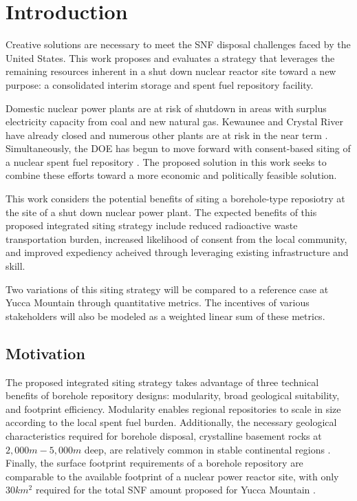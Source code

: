 
\section{Introduction}
Creative solutions are necessary to meet the \gls{SNF} disposal challenges 
faced by the United States.
This work proposes and evaluates a strategy that leverages the 
remaining resources inherent in a shut down nuclear reactor site toward a new 
purpose: a consolidated interim storage and spent fuel repository facility.

Domestic nuclear power plants are at risk of shutdown in areas with surplus 
electricity capacity from coal and new natural gas. Kewaunee and Crystal River 
have already closed  and numerous other plants are at risk in the near term 
\cite{nei_nuclear_2016}.  Simultaneously, the \gls{DOE} 
has begun to move forward with consent-based siting of a nuclear 
spent fuel repository \cite{doe_designing_2016}. The proposed solution in this 
work seeks to combine these efforts toward a more economic and politically 
feasible solution. 

This work considers the potential benefits of siting a borehole-type reposiotry 
at the site of a shut down nuclear power plant.  The  expected benefits of this 
proposed integrated siting strategy include reduced radioactive waste 
transportation burden, increased likelihood of consent from the local 
community, and improved expediency acheived through leveraging existing 
infrastructure and skill.

Two variations of this siting strategy will be compared to a reference case at 
Yucca Mountain through quantitative metrics. The incentives of various 
stakeholders will also be modeled as a weighted linear sum of these 
metrics. 

\subsection{Motivation}
The proposed integrated siting strategy takes advantage of three technical 
benefits of borehole repository designs: modularity, broad geological 
suitability, and footprint efficiency. Modularity enables regional repositories 
to scale in size according to the local spent fuel burden. 
Additionally, the necessary geological characteristics required for borehole 
disposal, crystalline basement rocks at $2,000 m - 5,000 m$ deep, are relatively 
common in stable continental regions \cite{arnold_research_2012}. Finally, the 
surface footprint requirements of a borehole repository are comparable to the 
available footprint of a nuclear power reactor site, with only $30 km^2$ 
required for the total \gls{SNF} amount proposed for Yucca Mountain 
\cite{brady_deep_2009}.

